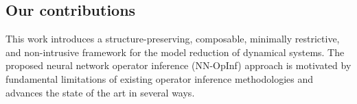 \documentclass[3p,computermodern,11pt]{elsarticle}
\numberwithin{equation}{section}
\newcommand{\code}[1]{{\ttfamily\color{black} #1}}
\begin{document}

\subsection{Our contributions}

This work introduces a structure-preserving, composable, minimally restrictive, and non-intrusive framework for the model reduction of dynamical systems.
The proposed neural network operator inference (NN-OpInf) approach is motivated by fundamental limitations of existing operator inference methodologies and advances the state of the art in several ways.
\end{document}
